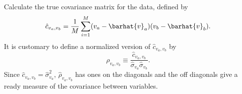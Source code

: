 \Question{} Calculate the true covariance matrix for the data, defined by
%
\begin{equation}
    \hat{c}_{v_a, v_b} = \frac{ 1 }{ M } \sum_{i=1}^M (v_a - \barhat{v}_a) (v_b - \barhat{v}_b).
\end{equation}
%
It is customary to define a normalized version of \(\hat{c}_{v_a, v_b}\) by
%
\begin{equation}
    \hat{\rho}_{v_a, v_b} \equiv \frac{ \hat{c}_{v_a, v_b} }{ \hat{\sigma}_{v_a} \hat{\sigma}_{v_b} }.
\end{equation}
%
Since \(\hat{c}_{v_a, v_b} = \hat{\sigma}_{v_a}^2\),
\(\hat{\rho}_{v_a, v_b}\) has ones on the diagonals and the off diagonals give a
ready measure of the covariance between variables.

\Answer{}

